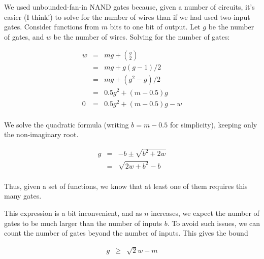 \documentclass[12pt]{article}
\theoremstyle{definition}
\begin{document}
We used unbounded-fan-in NAND gates because, given a number of circuits,
it's easier (I think!) to solve for the number of wires than if we had
used two-input gates.
Consider functions from $m$ bits to one bit of output.
Let $g$ be the number of gates, and $w$ be the number of wires.
Solving for the number of gates:

\begin{eqnarray*}
w & = & mg + {g \choose 2} \\
  & = & mg + g(g-1)/2 \\
  & = & mg + (g^2 - g) / 2 \\
  & = & 0.5g^2 + (m-0.5)g \\
0 & = & 0.5g^2 + (m-0.5)g - w \\
\end{eqnarray*}

We solve the quadratic formula (writing $b = m-0.5$ for simplicity), keeping
only the non-imaginary root.

\begin{eqnarray*}
g & = & -b \pm \sqrt{ b^2 + 2w} \\
  & = & {\sqrt {2w + b^2}} - b \\
\end{eqnarray*}

Thus, given a set of functions, we know that at least one of them requires
this many gates.

This expression is a bit inconvenient, and as $n$ increases, we
expect the number of gates to be much larger than the number of
inputs $b$. To avoid such issues, we can count the number of gates
beyond the number of inputs. This gives the bound

\begin{eqnarray*}
g & \ge & {\sqrt 2w} - m \\
\end{eqnarray*}




\end{document}
